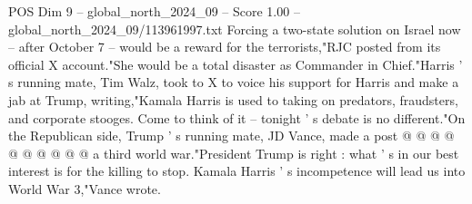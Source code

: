 \begin{textsample}{POS Dim 9 – global\_north\_2024\_09 – Score 1.00 – global\_north\_2024\_09/113961997.txt}
Forcing a two-state solution on Israel now -- after October 7 -- would be a reward for the terrorists,"RJC posted from its official X account."She would be a total disaster as Commander in Chief."Harris ' s running mate, Tim Walz, took to X to voice his support for Harris and make a jab at Trump, writing,"Kamala Harris is used to taking on predators, fraudsters, and corporate stooges.
Come to think of it -- tonight ' s debate is no different."On the Republican side, Trump ' s running mate, JD Vance, made a post @ @ @ @ @ @ @ @ @ @ a third world war."President Trump is right : what ' s in our best interest is for the killing to stop.
Kamala Harris ' s incompetence will lead us into World War 3,"Vance wrote.

\end{textsample}

